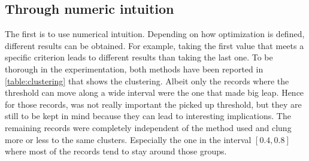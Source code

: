 \subsection{Through numeric intuition}
The first is to use numerical intuition. Depending on how optimization is defined, different results can be obtained. For example, taking the first value that meets a specific criterion leads to different results than taking the last one. To be thorough in the experimentation, both methods have been reported in \ref{table:clustering} that shows the clustering. Albeit only the records where the threshold can move along a wide interval were the one that made big leap. Hence for those records, was not really important the picked up threshold, but they are still to be kept in mind because they can lead to interesting implications. The remaining records were completely independent of the method used and clung more or less to the same clusters. Especially the one in the interval $[0.4, 0.8]$ where most of the records tend to stay around those groups.
